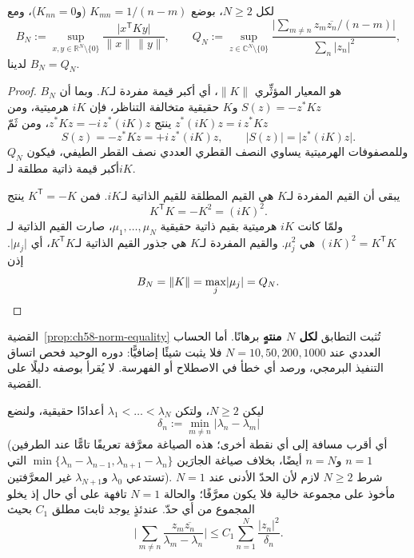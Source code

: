 \begin{proposition}
\label{prop:ch58-norm-equality}
\provedhere
لكل \(N\ge2\)، بوضع \(K_{mn}=1/(n-m)\) (و\(K_{nn}=0\))، ومع
\[
B_N:=\sup_{x,y\in\mathbb{R}^N\setminus\{0\}}
\frac{\lvert x^{\mathsf T}Ky\rvert}{\lVert x\rVert\,\lVert y\rVert},
\qquad
Q_N:=\sup_{z\in\mathbb{C}^N\setminus\{0\}}
\frac{\bigl\lvert\sum_{m\ne n}z_m\overline{z_n}/(n-m)\bigr\rvert}{\sum_n\lvert z_n\rvert^2},
\]
لدينا \(B_N=Q_N\).
\end{proposition}

\begin{proof}
\(B_N\) هو المعيار المؤثِّري \(\lVert K\rVert\)، أي أكبر قيمة مفردة
لـ\(K\). وبما أن \(S(z)=-z^{*}Kz\) و\(K\) حقيقية متخالفة التناظر، فإن
\(iK\) هرميتية، ومن \(z^{*}(iK)z=i\,z^{*}Kz\) ينتج
\(z^{*}Kz=-i\,z^{*}(iK)z\)، ومن ثَمّ
\[
S(z)=-z^{*}Kz=+i\,z^{*}(iK)z,
\qquad
\lvert S(z)\rvert=\lvert z^{*}(iK)z\rvert .
\]
وللمصفوفات الهرميتية يساوي النصف القطري العددي نصف القطر الطيفي، فيكون
\(Q_N\) أكبر قيمة ذاتية مطلقة لـ\(iK\).

يبقى أن القيم المفردة لـ\(K\) هي القيم المطلقة للقيم الذاتية لـ\(iK\).
فمن \(K^{\mathsf T}=-K\) ينتج
\[
K^{\mathsf T}K=-K^2=(iK)^2 .
\]
ولمّا كانت \(iK\) هرميتية بقيم ذاتية حقيقية \(\mu_1,\dots,\mu_N\)، صارت
القيم الذاتية لـ\((iK)^2=K^{\mathsf T}K\) هي \(\mu_j^2\). والقيم المفردة
لـ\(K\) هي جذور القيم الذاتية لـ\(K^{\mathsf T}K\)، أي \(\lvert\mu_j\rvert\).
إذن
\[
B_N=\lVert K\rVert=\max_j\lvert\mu_j\rvert=Q_N. \qedhere
\]
\end{proof}

\begin{remark}
\label{rem:ch58-numeric-role}
القضية~\ref{prop:ch58-norm-equality} تُثبت التطابق \textbf{لكل \(N\)
منتهٍ} برهانًا. أما الحساب العددي عند \(N=10,50,200,1000\) فلا يثبت شيئًا
إضافيًّا: دوره الوحيد فحص اتساق التنفيذ البرمجي، ورصد أي خطأ في
الاصطلاح أو الفهرسة. لا يُقرأ بوصفه دليلًا على القضية.
\end{remark}

\begin{proposition}
\label{prop:ch58-mv-weighted-cited}
ليكن \(N\ge2\)، ولتكن \(\lambda_1<\dots<\lambda_N\) أعدادًا حقيقية،
ولنضع
\[
\delta_n:=\min_{m\ne n}\lvert\lambda_n-\lambda_m\rvert
\]
(أي أقرب مسافة إلى أي نقطة أخرى؛ هذه الصياغة معرَّفة تعريفًا تامًّا عند
الطرفين \(n=1\) و\(n=N\) أيضًا، بخلاف صياغة الجارَين
\(\min\{\lambda_n-\lambda_{n-1},\lambda_{n+1}-\lambda_n\}\) التي تستدعي
\(\lambda_0\) و\(\lambda_{N+1}\) غير المعرَّفتين). شرط \(N\ge2\) لازم
لأن الحدّ الأدنى عند \(N=1\) مأخوذ على مجموعة خالية فلا يكون معرَّفًا؛
والحالة \(N=1\) تافهة على أي حال إذ يخلو المجموع من أي حدّ.
عندئذٍ يوجد ثابت مطلق \(C_1\) بحيث
\[
\Biggl\lvert\sum_{m\ne n}\frac{z_m\overline{z_n}}{\lambda_m-\lambda_n}\Biggr\rvert
\le C_1\sum_{n=1}^{N}\frac{\lvert z_n\rvert^2}{\delta_n}.
\]
\end{proposition}

